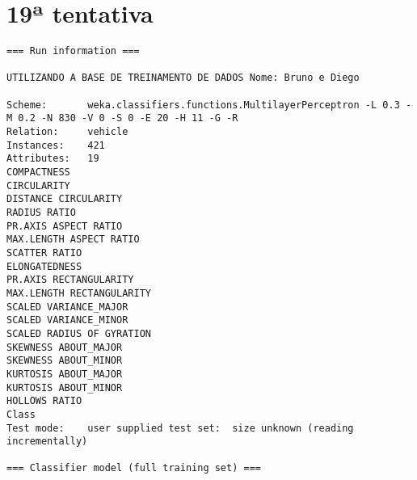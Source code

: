 \documentclass[
	article,			%
	11pt,				%
	oneside,			%
	a4paper,			%
	english,			%
	brazil,				%
	sumario=tradicional
	]{abntex2}
\begin{document}
\section{19ª tentativa}

\begin{lstlisting}
=== Run information ===

UTILIZANDO A BASE DE TREINAMENTO DE DADOS Nome: Bruno e Diego

Scheme:       weka.classifiers.functions.MultilayerPerceptron -L 0.3 -M 0.2 -N 830 -V 0 -S 0 -E 20 -H 11 -G -R
Relation:     vehicle
Instances:    421
Attributes:   19
COMPACTNESS
CIRCULARITY
DISTANCE CIRCULARITY
RADIUS RATIO
PR.AXIS ASPECT RATIO
MAX.LENGTH ASPECT RATIO
SCATTER RATIO
ELONGATEDNESS
PR.AXIS RECTANGULARITY
MAX.LENGTH RECTANGULARITY
SCALED VARIANCE_MAJOR
SCALED VARIANCE_MINOR
SCALED RADIUS OF GYRATION
SKEWNESS ABOUT_MAJOR
SKEWNESS ABOUT_MINOR
KURTOSIS ABOUT_MAJOR
KURTOSIS ABOUT_MINOR
HOLLOWS RATIO
Class
Test mode:    user supplied test set:  size unknown (reading incrementally)

=== Classifier model (full training set) ===


\end{lstlisting}
\end{document}
